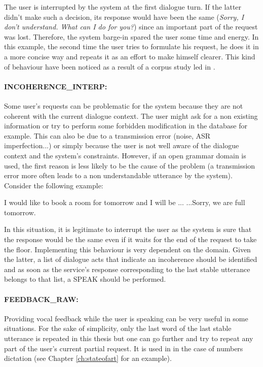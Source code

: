           The user is interrupted by the system at the first dialogue turn. If the latter didn't make such a decision, its response would have been the same (\textit{Sorry, I don't understand. What can I do for you?}) since an important part of the request was lost. Therefore, the system barge-in spared the user some time and energy. In this example, the second time the user tries to formulate his request, he does it in a more concise way and repeats it as an effort to make himself clearer. This kind of behaviour have been noticed as a result of a corpus study led in \cite{Ghigi2014}.

     \paragraph{INCOHERENCE\_INTERP:} Some user's requests can be problematic for the system because they are not coherent with the current dialogue context. The user might ask for a non existing information or try to perform some forbidden modification in the database for example. This can also be due to a transmission error (noise, ASR imperfection...) or simply because the user is not well aware of the dialogue context and the system's constraints. However, if an open grammar domain is used, the first reason is less likely to be the cause of the problem (a transmission error more often leads to a non understandable utterance by the system). Consider the following example:
		
					\begin{dialogue}
						 I would like to book a room for tomorrow and I will be ...
						 ...Sorry, we are full tomorrow.
					\end{dialogue}
					
					In this situation, it is legitimate to interrupt the user as the system is sure that the response would be the same even if it waits for the end of the request to take the floor. Implementing this behaviour is very dependent on the domain. Given the latter, a list of dialogue acts that indicate an incoherence should be identified and as soon as the service's response corresponding to the last stable utterance belongs to that list, a SPEAK should be performed.
					
			\paragraph{FEEDBACK\_RAW:} Providing vocal feedback while the user is speaking can be very useful in some situations. For the sake of simplicity, only the last word of the last stable utterance is repeated in this thesis but one can go further and try to repeat any part of the user's current partial request. It is used in \cite{Skantze2009,Khouzaimi2014a} in the case of numbers dictation (see Chapter \ref{ch:stateofart} for an example).
			
